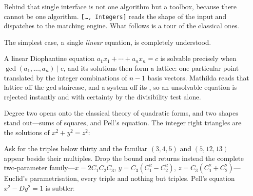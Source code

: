 Behind that single interface is not one algorithm but a toolbox, because there cannot be
one algorithm. \texttt{[\ldots, Integers]} reads the shape of the input and
dispatches to the matching engine. What follows is a tour of the classical ones.

The simplest case, a single \emph{linear} equation, is completely understood.

\begin{codepairs}
\end{codepairs}

A linear Diophantine equation $a_1x_1+\cdots+a_nx_n=c$ is solvable precisely when
$\gcd(a_1,\ldots,a_n)\mid c$, and its solutions then form a lattice: one particular point
translated by the integer combinations of $n-1$ basis vectors. Mathilda reads that lattice
off the gcd staircase, and a system off its , so an unsolvable
equation is rejected instantly and with certainty by the divisibility test alone.

Degree two opens onto the classical theory of quadratic forms, and two shapes stand
out---sums of squares, and Pell's equation. The integer right triangles are the solutions
of $x^2+y^2=z^2$:


Ask for the triples below thirty and the familiar $(3,4,5)$ and $(5,12,13)$ appear beside
their multiples. Drop the bound and  returns instead the complete two-parameter
family---$x=2C_1C_2C_3$, $y=C_3(C_1^2-C_2^2)$, $z=C_3(C_1^2+C_2^2)$---Euclid's
parametrisation, every triple and nothing but triples. Pell's equation $x^2-Dy^2=1$ is
subtler:


